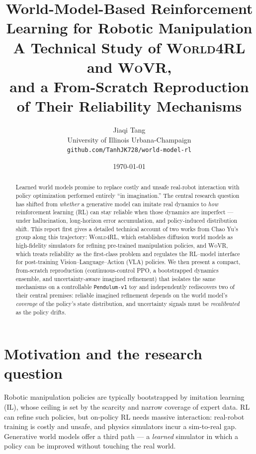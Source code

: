 \documentclass[11pt]{article}
\title{\textbf{World-Model-Based Reinforcement Learning for Robotic Manipulation}\\[4pt]
\large A Technical Study of \textsc{World4RL} and \textsc{WoVR},\\
and a From-Scratch Reproduction of Their Reliability Mechanisms}
\author{Jiaqi Tang\\ \small University of Illinois Urbana-Champaign\\ \small \texttt{github.com/TanhJK728/world-model-rl}}
\date{\today}
\begin{document}
\maketitle

\begin{abstract}
Learned world models promise to replace costly and unsafe real-robot interaction with policy
optimization performed entirely ``in imagination.'' The central research question has shifted from
\emph{whether} a generative model can imitate real dynamics to \emph{how} reinforcement learning (RL)
can stay reliable when those dynamics are imperfect --- under hallucination, long-horizon error
accumulation, and policy-induced distribution shift. This report first gives a detailed technical
account of two works from Chao Yu's group along this trajectory: \textsc{World4RL}, which establishes
diffusion world models as high-fidelity simulators for refining pre-trained manipulation policies,
and \textsc{WoVR}, which treats reliability as the first-class problem and regulates the RL--model
interface for post-training Vision--Language--Action (VLA) policies. We then present a compact,
from-scratch reproduction (continuous-control PPO, a bootstrapped dynamics ensemble, and
uncertainty-aware imagined refinement) that isolates the same mechanisms on a controllable
\texttt{Pendulum-v1} toy and independently rediscovers two of their central premises: reliable
imagined refinement depends on the world model's \emph{coverage} of the policy's state distribution,
and uncertainty signals must be \emph{recalibrated} as the policy drifts.
\end{abstract}

\tableofcontents
\bigskip

\section{Motivation and the research question}
Robotic manipulation policies are typically bootstrapped by imitation learning (IL), whose ceiling is
set by the scarcity and narrow coverage of expert data. RL can refine such policies, but on-policy RL
needs massive interaction: real-robot training is costly and unsafe, and physics simulators incur a
sim-to-real gap. Generative world models offer a third path --- a \emph{learned} simulator in which a
policy can be improved without touching the real world.
\end{document}

